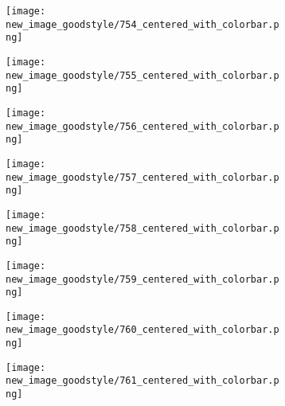 \documentclass[a4paper,12pt]{article}
\begin{document}
\begin{figure}[H]
  \begin{subfigure}{0.11\textwidth}
    \texttt{[image: new\_image\_goodstyle/754\_centered\_with\_colorbar.png]}
  \end{subfigure}
  \hfill
  \begin{subfigure}{0.11\textwidth}
    \texttt{[image: new\_image\_goodstyle/755\_centered\_with\_colorbar.png]}
  \end{subfigure}
  \hfill
  \begin{subfigure}{0.11\textwidth}
    \texttt{[image: new\_image\_goodstyle/756\_centered\_with\_colorbar.png]}
  \end{subfigure}
  \hfill
  \begin{subfigure}{0.11\textwidth}
    \texttt{[image: new\_image\_goodstyle/757\_centered\_with\_colorbar.png]}
  \end{subfigure}
  \hfill
  \begin{subfigure}{0.11\textwidth}
    \texttt{[image: new\_image\_goodstyle/758\_centered\_with\_colorbar.png]}
  \end{subfigure}
  \hfill
  \begin{subfigure}{0.11\textwidth}
    \texttt{[image: new\_image\_goodstyle/759\_centered\_with\_colorbar.png]}
  \end{subfigure}
  \hfill
  \begin{subfigure}{0.11\textwidth}
    \texttt{[image: new\_image\_goodstyle/760\_centered\_with\_colorbar.png]}
  \end{subfigure}
  \hfill
  \begin{subfigure}{0.11\textwidth}
    \texttt{[image: new\_image\_goodstyle/761\_centered\_with\_colorbar.png]}
  \end{subfigure}
  \hfill
\end{figure}
\end{document}
